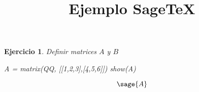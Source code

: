 \documentclass{amsart}
\title{Ejemplo SageTeX}
\newtheorem{ejer}{Ejercicio}
\begin{document}
	
	\begin{ejer}
	\maketitle
	
	Definir matrices $A$ y $B$
	
	\begin{sageblock}
		A = matrix(QQ, [[1,2,3],[4,5,6]])
		show(A)
	\end{sageblock}

	$$
		\sage{A}
	$$

	
	
	\end{ejer}	
\end{document}

